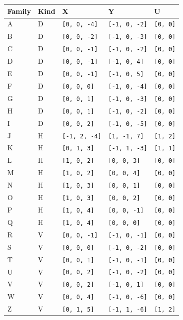 \documentclass[
  10pt,
]{scrreprt}
\begin{document}
\begin{longtable}[]{@{}lllll@{}}
\toprule\noalign{}
Family & Kind & X & Y & U \\
\midrule\noalign{}
\endhead
\bottomrule\noalign{}
\endlastfoot
A & D & \texttt{{[}0,\ 0,\ -4{]}} & \texttt{{[}-1,\ 0,\ -2{]}} &
\texttt{{[}0,\ 0{]}} \\
B & D & \texttt{{[}0,\ 0,\ -2{]}} & \texttt{{[}-1,\ 0,\ -3{]}} &
\texttt{{[}0,\ 0{]}} \\
C & D & \texttt{{[}0,\ 0,\ -1{]}} & \texttt{{[}-1,\ 0,\ -2{]}} &
\texttt{{[}0,\ 0{]}} \\
D & D & \texttt{{[}0,\ 0,\ -1{]}} & \texttt{{[}-1,\ 0,\ 4{]}} &
\texttt{{[}0,\ 0{]}} \\
E & D & \texttt{{[}0,\ 0,\ -1{]}} & \texttt{{[}-1,\ 0,\ 5{]}} &
\texttt{{[}0,\ 0{]}} \\
F & D & \texttt{{[}0,\ 0,\ 0{]}} & \texttt{{[}-1,\ 0,\ -4{]}} &
\texttt{{[}0,\ 0{]}} \\
G & D & \texttt{{[}0,\ 0,\ 1{]}} & \texttt{{[}-1,\ 0,\ -3{]}} &
\texttt{{[}0,\ 0{]}} \\
H & D & \texttt{{[}0,\ 0,\ 1{]}} & \texttt{{[}-1,\ 0,\ -2{]}} &
\texttt{{[}0,\ 0{]}} \\
I & D & \texttt{{[}0,\ 0,\ 2{]}} & \texttt{{[}-1,\ 0,\ -5{]}} &
\texttt{{[}0,\ 0{]}} \\
J & H & \texttt{{[}-1,\ 2,\ -4{]}} & \texttt{{[}1,\ -1,\ 7{]}} &
\texttt{{[}1,\ 2{]}} \\
K & H & \texttt{{[}0,\ 1,\ 3{]}} & \texttt{{[}-1,\ 1,\ -3{]}} &
\texttt{{[}1,\ 1{]}} \\
L & H & \texttt{{[}1,\ 0,\ 2{]}} & \texttt{{[}0,\ 0,\ 3{]}} &
\texttt{{[}0,\ 0{]}} \\
M & H & \texttt{{[}1,\ 0,\ 2{]}} & \texttt{{[}0,\ 0,\ 4{]}} &
\texttt{{[}0,\ 0{]}} \\
N & H & \texttt{{[}1,\ 0,\ 3{]}} & \texttt{{[}0,\ 0,\ 1{]}} &
\texttt{{[}0,\ 0{]}} \\
O & H & \texttt{{[}1,\ 0,\ 3{]}} & \texttt{{[}0,\ 0,\ 2{]}} &
\texttt{{[}0,\ 0{]}} \\
P & H & \texttt{{[}1,\ 0,\ 4{]}} & \texttt{{[}0,\ 0,\ -1{]}} &
\texttt{{[}0,\ 0{]}} \\
Q & H & \texttt{{[}1,\ 0,\ 4{]}} & \texttt{{[}0,\ 0,\ 0{]}} &
\texttt{{[}0,\ 0{]}} \\
R & V & \texttt{{[}0,\ 0,\ -1{]}} & \texttt{{[}-1,\ 0,\ -1{]}} &
\texttt{{[}0,\ 0{]}} \\
S & V & \texttt{{[}0,\ 0,\ 0{]}} & \texttt{{[}-1,\ 0,\ -2{]}} &
\texttt{{[}0,\ 0{]}} \\
T & V & \texttt{{[}0,\ 0,\ 1{]}} & \texttt{{[}-1,\ 0,\ -1{]}} &
\texttt{{[}0,\ 0{]}} \\
U & V & \texttt{{[}0,\ 0,\ 2{]}} & \texttt{{[}-1,\ 0,\ -2{]}} &
\texttt{{[}0,\ 0{]}} \\
V & V & \texttt{{[}0,\ 0,\ 2{]}} & \texttt{{[}-1,\ 0,\ 1{]}} &
\texttt{{[}0,\ 0{]}} \\
W & V & \texttt{{[}0,\ 0,\ 4{]}} & \texttt{{[}-1,\ 0,\ -6{]}} &
\texttt{{[}0,\ 0{]}} \\
Z & V & \texttt{{[}0,\ 1,\ 5{]}} & \texttt{{[}-1,\ 1,\ -6{]}} &
\texttt{{[}1,\ 2{]}} \\
\end{longtable}
\end{document}
